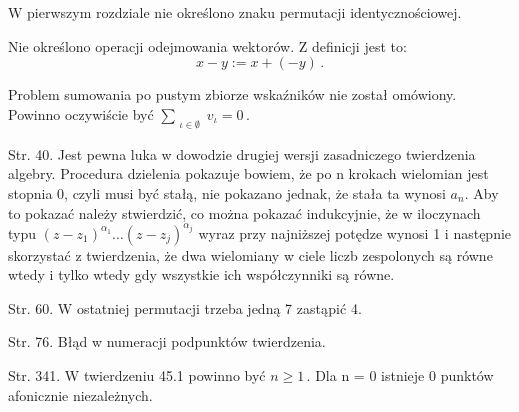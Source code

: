 \documentclass[a4paper,11pt]{article}
\numberwithin{equation}{section}
\begin{document}
\VerSpaceFour





\noindent
W pierwszym rozdziale nie określono znaku permutacji identycznościowej.

\VerSpaceFour





\noindent
Nie określono operacji odejmowania wektorów. Z definicji jest
to:$$x - y := x + ( -y ) \, .$$

\VerSpaceFour





\noindent
Problem sumowania po pustym zbiorze wskaźników nie został omówiony.
Powinno oczywiście być $\sum_{ \substack{ \iota \in \emptyset } } v_{ \iota } = 0 \, .$

\VerSpaceFour





\noindent
Str. 40. Jest pewna luka w dowodzie drugiej wersji zasadniczego
twierdzenia algebry. Procedura dzielenia pokazuje bowiem, że po n
krokach wielomian jest stopnia 0, czyli musi być stałą, nie pokazano
jednak, że stała ta wynosi $a_{ n }$. Aby to pokazać należy
stwierdzić, co można pokazać indukcyjnie, że w iloczynach typu
$( z - z_{ 1 } )^{ \alpha_{ 1 } } \ldots( z - z_{ j } )^{ \alpha_{ j } }$
wyraz przy najniższej potędze wynosi 1 i następnie skorzystać z
twierdzenia, że dwa wielomiany w ciele liczb zespolonych są równe
wtedy i tylko wtedy gdy wszystkie ich współczynniki są równe.

\VerSpaceFour





\noindent
Str. 60. W ostatniej permutacji trzeba jedną 7 zastąpić 4.

\VerSpaceFour





\noindent
Str. 76. Błąd w numeracji podpunktów twierdzenia.

\VerSpaceFour





\noindent
Str. 341. W twierdzeniu 45.1 powinno być $n \geq 1 \, .$ Dla n = 0
istnieje 0 punktów afonicznie niezależnych.





\newpage
\end{document}
